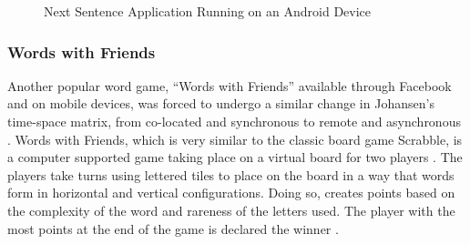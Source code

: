 \documentclass{sigchi}
\begin{document}
\begin{figure}[H]
\hfill
{}
\hfil
{}
\hfill
\caption{Next Sentence Application Running on an Android Device}
\label{fig:next-sentence}
\end{figure}


\subsubsection{Words with Friends}
Another popular word game, ``Words with Friends'' available through Facebook and on mobile devices, was forced to undergo a similar change in Johansen's time-space matrix, from co-located and synchronous to remote and asynchronous \cite{cscw-matrix, words-with-friends}. Words with Friends, which is very similar to the classic board game Scrabble, is a computer supported game taking place on a virtual board for two players \cite{words-with-friends-rules, scrabble}. The players take turns using lettered tiles to place on the board in a way that words form in horizontal and vertical configurations. Doing so, creates points based on the complexity of the word and rareness of the letters used. The player with the most points at the end of the game is declared the winner \cite{words-with-friends-win}.
\end{document}
